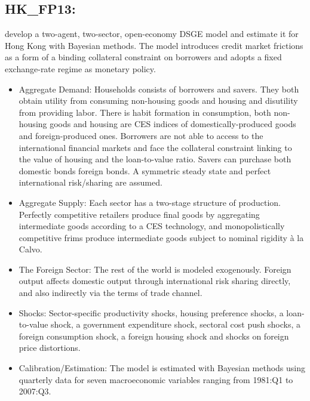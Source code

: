 \documentclass[11pt,a4paper]{article}
\begin{document}
	\subsection{HK\_FP13: \cite{FunkePaetz2013}}
	\label{HKFP13}
	\cite{FunkePaetz2013} develop a two-agent, two-sector, open-economy DSGE model and estimate it for Hong Kong with Bayesian methods. The model introduces credit market frictions as a form of a binding collateral constraint on borrowers and adopts a fixed exchange-rate regime as monetary policy.
	
	
	\begin{itemize}
		\item Aggregate Demand: Households consists of borrowers and savers. They both obtain utility from consuming non-housing goods and housing and disutility from providing labor. There is habit formation in consumption, both non-housing goods and housing are CES indices of domestically-produced goods and foreign-produced ones. Borrowers are not able to access to the international financial markets and face the collateral constraint linking to the value of housing and the loan-to-value ratio. Savers can purchase both domestic bonds foreign bonds. A symmetric steady state and perfect international risk/sharing are assumed.
		
		\item Aggregate Supply: Each sector has a two-stage structure of production. Perfectly competitive retailers produce final goods by aggregating intermediate goods according to a CES technology, and monopolistically competitive frims produce intermediate goods subject to nominal rigidity \`{a} la Calvo.
		
		\item The Foreign Sector: The rest of the world is modeled exogenously. Foreign output affects domestic output through international risk sharing directly, and also indirectly via the terms of trade channel.
		
		\item Shocks: Sector-specific productivity shocks, housing preference shocks, a loan-to-value shock, a government expenditure shock, sectoral cost push shocks, a foreign consumption shock, a foreign housing shock and shocks on foreign price distortions.
		
		\item Calibration/Estimation: The model is estimated with Bayesian methods using quarterly data for seven macroeconomic variables ranging from 1981:Q1 to 2007:Q3.
		
	\end{itemize}
\end{document}
